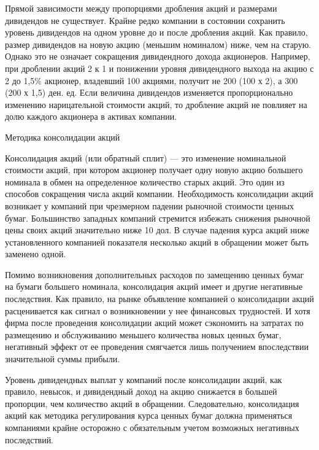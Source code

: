 Прямой зависимости между пропорциями дробления акций и размерами дивидендов не существует. Крайне редко компании в состоянии сохранить уровень дивидендов на одном уровне до и после дробления акций. Как правило, размер дивидендов на новую акцию (меньшим номиналом) ниже, чем на старую. Однако это не означает сокращения дивидендного дохода акционеров. Например, при дроблении акций 2 к 1 и понижении уровня дивидендного выхода на акцию с 2 до 1,5\% акционер, владевший 100 акциями, получит не 200 (100 х 2), а 300 (200  х 1,5) ден. ед. Если величина дивидендов изменяется пропорционально изменению нарицательной стоимости акций, то дробление акций не повлияет на долю каждого акционера в активах компании.

Методика консолидации акций

Консолидация акций (или обратный сплит) --- это изменение номинальной стоимости акций, при котором акционер получает одну новую акцию большего номинала в обмен на определенное количество старых акций. Это один из способов сокращения числа акций компании. Необходимость консолидации акций возникает у компаний при чрезмерном падении рыночной стоимости ценных бумаг. Большинство западных компаний стремится избежать снижения рыночной цены своих акций значительно ниже 10 дол. В случае падения курса акций ниже установленного компанией показателя несколько акций в обращении может быть заменено одной.

Помимо возникновения дополнительных расходов по замещению ценных бумаг на бумаги большего номинала, консолидация акций имеет и другие негативные последствия. Как правило, на рынке объявление компанией о консолидации акций расценивается как сигнал о возникновении у нее финансовых трудностей. И хотя фирма после проведения консолидации акций может сэкономить на затратах по размещению и обслуживанию меньшего количества новых ценных бумаг, негативный эффект от ее проведения смягчается лишь получением впоследствии значительной суммы прибыли.

Уровень дивидендных выплат у компаний после консолидации акций, как правило, невысок, и дивидендный доход на акцию снижается в большей пропорции, чем количество акций в обращении. Следовательно, консолидация акций как методика регулирования курса ценных бумаг должна применяться компаниями крайне осторожно с обязательным учетом возможных негативных последствий.








